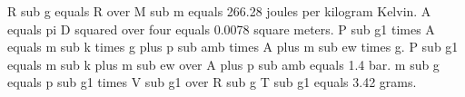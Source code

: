 R sub g equals R over M sub m equals 266.28 joules per kilogram Kelvin. A equals pi D squared over four equals 0.0078 square meters. P sub g1 times A equals m sub k times g plus p sub amb times A plus m sub ew times g. P sub g1 equals m sub k plus m sub ew over A plus p sub amb equals 1.4 bar. m sub g equals p sub g1 times V sub g1 over R sub g T sub g1 equals 3.42 grams.